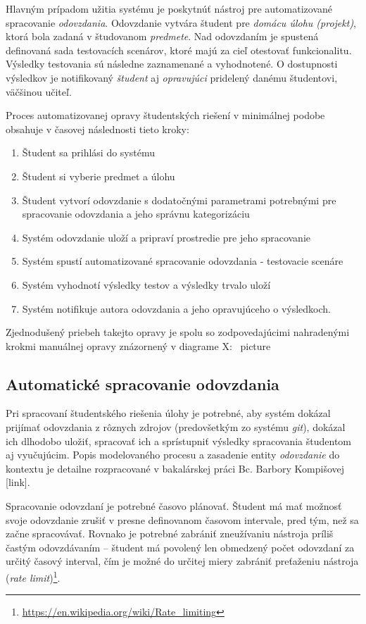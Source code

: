 \documentclass[
  digital, %
  twoside, %
  table,   %
  lof,     %
  lot,     %
]{fithesis3}
\begin{document}
Hlavným prípadom užitia systému je poskytnúť nástroj pre automatizované spracovanie \emph{odovzdania}. Odovzdanie vytvára študent pre \emph{domácu úlohu (projekt)}, ktorá bola zadaná v študovanom \emph{predmete}. Nad odovzdaním je spustená definovaná sada testovacích scenárov, ktoré majú za cieľ otestovať funkcionalitu. Výsledky testovania sú následne zaznamenané a vyhodnotené. O dostupnosti výsledkov je notifikovaný \emph{študent} aj \emph{opravujúci} pridelený danému študentovi, väčšinou učiteľ.

Proces automatizovanej opravy študentských riešení v minimálnej podobe obsahuje v časovej následnosti tieto kroky:
\begin{enumerate}
    \item Študent sa prihlási do systému
    \item Študent si vyberie predmet a úlohu
    \item Študent vytvorí odovzdanie s dodatočnými parametrami potrebnými pre spracovanie odovzdania a jeho správnu kategorizáciu
    \item Systém odovzdanie uloží a pripraví prostredie pre jeho spracovanie
    \item Systém spustí automatizované spracovanie odovzdania - testovacie scenáre
    \item Systém vyhodnotí výsledky testov a výsledky trvalo uloží
    \item Systém notifikuje autora odovzdania a jeho opravujúceho o výsledkoch.
\end{enumerate}

Zjednodušený priebeh takejto opravy je spolu so zodpovedajúcimi nahradenými krokmi manuálnej opravy znázornený v diagrame X:
\ picture


\subsection{Automatické spracovanie odovzdania}

Pri spracovaní študentského riešenia úlohy je potrebné, aby systém dokázal prijímať odovzdania z rôznych zdrojov (predovšetkým zo systému \emph{git}), dokázal ich dlhodobo uložiť, spracovať ich a sprístupniť výsledky spracovania študentom aj vyučujúcim. Popis modelovaného procesu a zasadenie entity \textit{odovzdanie} do kontextu je detailne rozpracované v bakalárskej práci Bc. Barbory Kompišovej [link].

Spracovanie odovzdaní je potrebné časovo plánovať. Študent má mať možnosť svoje odovzdanie zrušiť v presne definovanom časovom intervale, pred tým, než sa začne spracovávať. Rovnako je potrebné zabrániť zneužívaniu nástroja príliš častým odovzdávaním -- študent má povolený len obmedzený počet odovzdaní za určitý časový interval, čím je možné do určitej miery zabrániť preťaženiu nástroja (\emph{rate limit})\footnote{\url{https://en.wikipedia.org/wiki/Rate_limiting}}.
\end{document}
